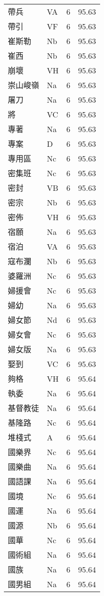 \documentclass[twocolumn]{book}
\begin{document}
\begin{supertabular}{llrr}
帶兵 & VA & 6 &  95.63\\
帶引 & VF & 6 &  95.63\\
崔斯勒 & Nb & 6 &  95.63\\
崔西 & Nb & 6 &  95.63\\
崩壞 & VH & 6 &  95.63\\
崇山峻嶺 & Na & 6 &  95.63\\
屠刀 & Na & 6 &  95.63\\
將 & VC & 6 &  95.63\\
專著 & Na & 6 &  95.63\\
專案 & D & 6 &  95.63\\
專用區 & Nc & 6 &  95.63\\
密集班 & Nc & 6 &  95.63\\
密封 & VB & 6 &  95.63\\
密宗 & Nb & 6 &  95.63\\
密佈 & VH & 6 &  95.63\\
宿願 & Na & 6 &  95.63\\
宿泊 & VA & 6 &  95.63\\
寇布瀾 & Nb & 6 &  95.63\\
婆羅洲 & Nc & 6 &  95.63\\
婦援會 & Nc & 6 &  95.63\\
婦幼 & Na & 6 &  95.63\\
婦女節 & Nd & 6 &  95.63\\
婦女會 & Nc & 6 &  95.63\\
婦女版 & Na & 6 &  95.63\\
娶到 & VC & 6 &  95.63\\
夠格 & VH & 6 &  95.64\\
執委 & Na & 6 &  95.64\\
基督教徒 & Na & 6 &  95.64\\
基隆路 & Nc & 6 &  95.64\\
堆棧式 & A & 6 &  95.64\\
國樂界 & Nc & 6 &  95.64\\
國樂曲 & Na & 6 &  95.64\\
國語課 & Na & 6 &  95.64\\
國境 & Nc & 6 &  95.64\\
國運 & Na & 6 &  95.64\\
國源 & Nb & 6 &  95.64\\
國華 & Nc & 6 &  95.64\\
國術組 & Na & 6 &  95.64\\
國族 & Na & 6 &  95.64\\
國男組 & Na & 6 &  95.64\\

\end{supertabular}
\end{document}
